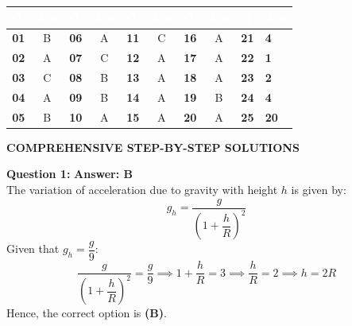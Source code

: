 \documentclass[11pt,a4paper]{article}
\begin{document}
\begin{center}
\renewcommand{\arraystretch}{1.25}
\small
\begin{tabularx}{\textwidth}{|>{\centering\arraybackslash}c|>{\centering\arraybackslash}c|>{\centering\arraybackslash}c|>{\centering\arraybackslash}c|>{\centering\arraybackslash}c|>{\centering\arraybackslash}c|>{\centering\arraybackslash}c|>{\centering\arraybackslash}c|>{\centering\arraybackslash}c|>{\centering\arraybackslash}X|}
\hline
\rowcolor{tableDarkHeader}
\textcolor{white}{\textbf{Q.}} & \textcolor{white}{\textbf{Ans}} & \textcolor{white}{\textbf{Q.}} & \textcolor{white}{\textbf{Ans}} & \textcolor{white}{\textbf{Q.}} & \textcolor{white}{\textbf{Ans}} & \textcolor{white}{\textbf{Q.}} & \textcolor{white}{\textbf{Ans}} & \textcolor{white}{\textbf{Q.}} & \textcolor{white}{\textbf{Ans}} \\
\hline
\rowcolor{white}
\textbf{01} & B & \textbf{06} & A & \textbf{11} & C & \textbf{16} & A & \textbf{21} & \textbf{4} \\
\hline
\rowcolor{tableStripe}
\textbf{02} & A & \textbf{07} & C & \textbf{12} & A & \textbf{17} & A & \textbf{22} & \textbf{1} \\
\hline
\rowcolor{white}
\textbf{03} & C & \textbf{08} & B & \textbf{13} & A & \textbf{18} & A & \textbf{23} & \textbf{2} \\
\hline
\rowcolor{tableStripe}
\textbf{04} & A & \textbf{09} & B & \textbf{14} & A & \textbf{19} & B & \textbf{24} & \textbf{4} \\
\hline
\rowcolor{white}
\textbf{05} & B & \textbf{10} & A & \textbf{15} & A & \textbf{20} & A & \textbf{25} & \textbf{20} \\
\hline
\end{tabularx}
\end{center}

\vspace{10pt}

\begin{tcolorbox}[sectionbanner]
  {\large \textbf{\textsf{COMPREHENSIVE STEP-BY-STEP SOLUTIONS}}}
\end{tcolorbox}
\vspace{4pt}

\begin{tcolorbox}[solbox]
  \textbf{\textcolor{primaryDark}{Question 1:}} \hfill \textbf{\textcolor{l1Green}{Answer: B}}\\
  \vspace{3pt}
  The variation of acceleration due to gravity with height $h$ is given by:
$$g_h = \frac{g}{\left(1 + \dfrac{h}{R}\right)^2}$$
\vspace{3pt}
Given that $g_h = \dfrac{g}{9}$:
$$\frac{g}{\left(1 + \dfrac{h}{R}\right)^2} = \frac{g}{9} \implies 1 + \frac{h}{R} = 3 \implies \frac{h}{R} = 2 \implies h = 2R$$
\vspace{3pt}
Hence, the correct option is \textbf{(B)}.
\end{tcolorbox}
\vspace{3pt}
\end{document}

